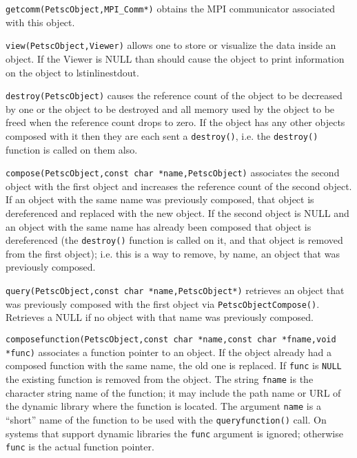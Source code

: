 \begin{tightitemize}
\item \lstinline{getcomm(PetscObject,MPI_Comm*)} obtains the MPI communicator associated
      with this object.

\item \lstinline{view(PetscObject,Viewer)} allows one to store or visualize the data inside
      an object. If the Viewer is NULL than should cause the object to print
      information on the object to lstinline{stdout}. 

\item \lstinline{destroy(PetscObject)} causes the reference count of the object to be decreased
      by one or the object to be destroyed and all memory used by the object to be freed when
      the reference count drops to zero.
      If the object has any other objects composed with it then they are each sent a
      \lstinline{destroy()}, i.e. the \lstinline{destroy()} function is called on them also.

\item \lstinline{compose(PetscObject,const char *name,PetscObject)} associates the second object with
      the first object and increases the reference count of the second object. If an
      object with the
      same name was previously composed, that object is dereferenced and replaced with
      the new object. If the
      second object is NULL and an object with the same name has already been
      composed that object is dereferenced (the \lstinline{destroy()} function is called on
      it, and that object is removed from the first object); i.e. this is a way to
      remove, by name, an object that was previously composed.

\item \lstinline{query(PetscObject,const char *name,PetscObject*)} retrieves an object that was
      previously composed with the first object via \lstinline{PetscObjectCompose()}. Retrieves a NULL if no object with
      that name was previously composed.

\item \lstinline{composefunction(PetscObject,const char *name,const char *fname,void *func)} associates a function
      pointer to an object. If the object already had a composed function with the
      same name, the old one is replaced. If \lstinline{func} is \lstinline{NULL} the existing function is removed from
      the object. The string \lstinline{fname} is the character string name of the function;
      it may include the path name or URL of the dynamic library where the function is located.
      The argument \lstinline{name} is a ``short'' name of the function to be used with the
      \lstinline{queryfunction()} call. On systems that support dynamic libraries the \lstinline{func}
      argument is ignored; otherwise \lstinline{func} is the actual function pointer.


\end{tightitemize}
